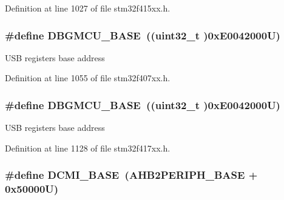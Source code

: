 Definition at line 1027 of file stm32f415xx.\+h.

\subsubsection[{\texorpdfstring{D\+B\+G\+M\+C\+U\+\_\+\+B\+A\+SE}{DBGMCU_BASE}}]{\setlength{\rightskip}{0pt plus 5cm}\#define D\+B\+G\+M\+C\+U\+\_\+\+B\+A\+SE~((uint32\+\_\+t )0x\+E0042000\+U)}\hypertarget{group___peripheral__registers__structures_ga4adaf4fd82ccc3a538f1f27a70cdbbef}{}\label{group___peripheral__registers__structures_ga4adaf4fd82ccc3a538f1f27a70cdbbef}
U\+SB registers base address 

Definition at line 1055 of file stm32f407xx.\+h.

\subsubsection[{\texorpdfstring{D\+B\+G\+M\+C\+U\+\_\+\+B\+A\+SE}{DBGMCU_BASE}}]{\setlength{\rightskip}{0pt plus 5cm}\#define D\+B\+G\+M\+C\+U\+\_\+\+B\+A\+SE~((uint32\+\_\+t )0x\+E0042000\+U)}\hypertarget{group___peripheral__registers__structures_ga4adaf4fd82ccc3a538f1f27a70cdbbef}{}\label{group___peripheral__registers__structures_ga4adaf4fd82ccc3a538f1f27a70cdbbef}
U\+SB registers base address 

Definition at line 1128 of file stm32f417xx.\+h.

\subsubsection[{\texorpdfstring{D\+C\+M\+I\+\_\+\+B\+A\+SE}{DCMI_BASE}}]{\setlength{\rightskip}{0pt plus 5cm}\#define D\+C\+M\+I\+\_\+\+B\+A\+SE~({\bf A\+H\+B2\+P\+E\+R\+I\+P\+H\+\_\+\+B\+A\+SE} + 0x50000\+U)}\hypertarget{group___peripheral__registers__structures_ga55b794507e021135486de57129a2505c}{}\label{group___peripheral__registers__structures_ga55b794507e021135486de57129a2505c}



